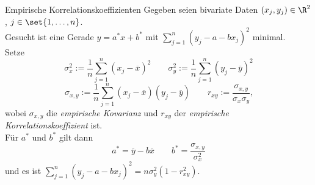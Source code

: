 \begin{karte}{Empirische Korrelationskoeffizienten}
	Gegeben seien bivariate Daten $(x_j,y_j) \in \R^2$, $j \in \set{1,\dotsc,n}$. \\
	Gesucht ist eine Gerade $y=a^{\ast}x+b^{\ast}$ mit $\displaystyle \sum_{j=1}^{n} (y_j-a-bx_j)^2$ minimal. \\
	Setze 
	$$\sigma_x^2 := \frac{1}{n} \sum_{j=1}^{n} (x_j-\overline{x})^2 \qquad \sigma_y^2 := \frac{1}{n} \sum_{j=1}^{n} (y_j-\overline{y})^2$$ $$\sigma_{x,y} := \frac{1}{n} \sum_{j=1}^{n} (x_j-\overline{x})(y_j-\overline{y}) \qquad r_{xy} :=\frac{\sigma_{x,y}}{\sigma_x \sigma_y} \text{,}$$
	wobei $\sigma_{x,y}$ die \textit{empirische Kovarianz} und $r_{xy}$ der \textit{empirische Korrelationskoeffizient} ist. \\
	Für $a^\ast$ und $b^\ast$ gilt dann
	$$a^\ast = \overline{y}-b\overline{x} \qquad b^\ast = \frac{\sigma_{x,y}}{\sigma_x^2}$$ und es ist
	$\displaystyle \sum_{j=1}^{n} (y_j-a-bx_j)^2 = n\sigma_y^2(1-r_{xy}^2)$.
	
\end{karte}